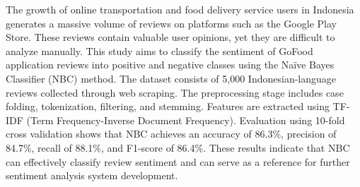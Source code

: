 
\noindent The growth of online transportation and food delivery service users in Indonesia generates a massive volume of reviews on platforms such as the Google Play Store. These reviews contain valuable user opinions, yet they are difficult to analyze manually. This study aims to classify the sentiment of GoFood application reviews into positive and negative classes using the Na\"ive Bayes Classifier (NBC) method. The dataset consists of 5,000 Indonesian-language reviews collected through web scraping. The preprocessing stage includes case folding, tokenization, filtering, and stemming. Features are extracted using TF-IDF (Term Frequency-Inverse Document Frequency). Evaluation using 10-fold cross validation shows that NBC achieves an accuracy of 86.3\%, precision of 84.7\%, recall of 88.1\%, and F1-score of 86.4\%. These results indicate that NBC can effectively classify review sentiment and can serve as a reference for further sentiment analysis system development.